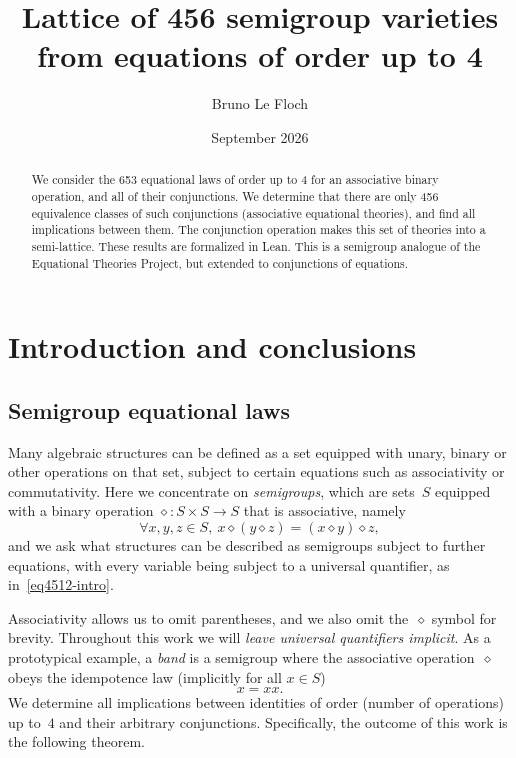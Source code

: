 \documentclass[12pt]{amsart}
\title[Lattice of 456 semigroup varieties]{Lattice of 456 semigroup varieties\\from equations of order up to 4}
\author{Bruno Le Floch}
\date{September 2026}
\theoremstyle{plain}
\theoremstyle{definition}
\newcommand{\op}{\diamond}
\newcommand{\implicitop}{}
\begin{document}
\begin{abstract}
  We consider the 653 equational laws of order up to 4 for an associative binary operation, and all of their conjunctions.
  We determine that there are only 456 equivalence classes of such conjunctions (associative equational theories), and find all implications between them.
  The conjunction operation makes this set of theories into a semi-lattice.
  These results are formalized in Lean.
  This is a semigroup analogue of the Equational Theories Project, but extended to conjunctions of equations.
\end{abstract}

\begingroup
\def\uppercasenonmath#1{} %
\let\MakeUppercase\relax %
\maketitle
\endgroup

\setcounter{tocdepth}{2}
\tableofcontents

\section{Introduction and conclusions}

\subsection{Semigroup equational laws}

Many algebraic structures can be defined as a set equipped with unary, binary or other operations on that set, subject to certain equations such as associativity or commutativity.  Here we concentrate on \emph{semigroups}, which are sets~$S$ equipped with a binary operation $\op:S\times S\to S$ that is associative, namely
\begin{equation}\label{eq4512-intro}
  \forall x,y,z\in S , \ x \op (y \op z) = (x \op y) \op z ,
\end{equation}
and we ask what structures can be described as semigroups subject to further equations, with every variable being subject to a universal quantifier, as in~\eqref{eq4512-intro}.

Associativity allows us to omit parentheses, and we also omit the~$\op$ symbol for brevity.
Throughout this work we will \emph{leave universal quantifiers implicit}.
As a prototypical example, a \emph{band} is a semigroup where the associative operation~$\op$ obeys the idempotence law (implicitly for all $x\in S$)
\begin{equation}\label{eq3-intro}
  x = x \implicitop x .
\end{equation}
We determine all implications between identities of order (number of operations) up to~$4$ and their arbitrary conjunctions.
Specifically, the outcome of this work is the following theorem.
\end{document}
